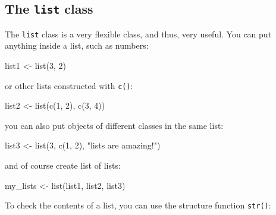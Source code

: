 \documentclass[
]{article}
\newenvironment{Shaded}{\begin{snugshade}}{\end{snugshade}}
\newcommand{\DecValTok}[1]{\textcolor[rgb]{0.00,0.00,0.81}{#1}}
\newcommand{\FunctionTok}[1]{\textcolor[rgb]{0.00,0.00,0.00}{#1}}
\newcommand{\NormalTok}[1]{#1}
\newcommand{\OtherTok}[1]{\textcolor[rgb]{0.56,0.35,0.01}{#1}}
\newcommand{\StringTok}[1]{\textcolor[rgb]{0.31,0.60,0.02}{#1}}
\begin{document}
\hypertarget{the-list-class}{%
\subsection{\texorpdfstring{The \texttt{list} class}{The list class}}\label{the-list-class}}

The \texttt{list} class is a very flexible class, and thus, very useful. You can put anything inside a list,
such as numbers:

\begin{Shaded}
\begin{Highlighting}[]
\NormalTok{list1 }\OtherTok{\textless{}{-}} \FunctionTok{list}\NormalTok{(}\DecValTok{3}\NormalTok{, }\DecValTok{2}\NormalTok{)}
\end{Highlighting}
\end{Shaded}

or other lists constructed with \texttt{c()}:

\begin{Shaded}
\begin{Highlighting}[]
\NormalTok{list2 }\OtherTok{\textless{}{-}} \FunctionTok{list}\NormalTok{(}\FunctionTok{c}\NormalTok{(}\DecValTok{1}\NormalTok{, }\DecValTok{2}\NormalTok{), }\FunctionTok{c}\NormalTok{(}\DecValTok{3}\NormalTok{, }\DecValTok{4}\NormalTok{))}
\end{Highlighting}
\end{Shaded}

you can also put objects of different classes in the same list:

\begin{Shaded}
\begin{Highlighting}[]
\NormalTok{list3 }\OtherTok{\textless{}{-}} \FunctionTok{list}\NormalTok{(}\DecValTok{3}\NormalTok{, }\FunctionTok{c}\NormalTok{(}\DecValTok{1}\NormalTok{, }\DecValTok{2}\NormalTok{), }\StringTok{"lists are amazing!"}\NormalTok{)}
\end{Highlighting}
\end{Shaded}

and of course create list of lists:

\begin{Shaded}
\begin{Highlighting}[]
\NormalTok{my\_lists }\OtherTok{\textless{}{-}} \FunctionTok{list}\NormalTok{(list1, list2, list3)}
\end{Highlighting}
\end{Shaded}

To check the contents of a list, you can use the structure function \texttt{str()}:
\end{document}
